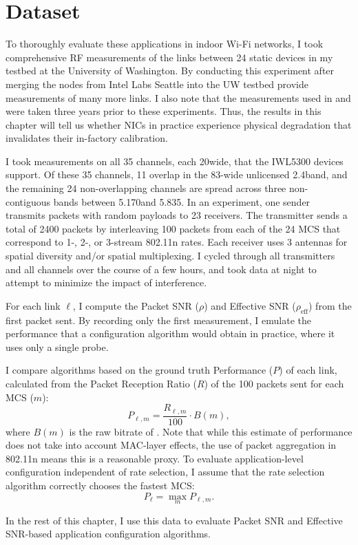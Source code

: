 \section{Dataset}
To thoroughly evaluate these applications in indoor Wi-Fi networks, I took comprehensive RF measurements of the links between 24 static devices in my testbed at the University of Washington. By conducting this experiment after merging the nodes from Intel Labs Seattle into the UW testbed provide measurements of many more links. I also note that the measurements used in  and  were taken three years prior to these experiments. Thus, the results in this chapter will tell us whether NICs in practice experience physical degradation that invalidates their in-factory calibration.

I took measurements on all 35 channels, each 20\MHz wide, that the IWL5300 devices support. Of these 35 channels, 11 overlap in the 83\MHz-wide unlicensed 2.4\GHz band, and the remaining 24 non-overlapping channels are spread across three non-contiguous bands between 5.170\GHz and 5.835\GHz. In an experiment, one sender transmits packets with random payloads to 23 receivers. The transmitter sends a total of 2400 packets by interleaving 100 packets from each of the 24 MCS that correspond to 1-, 2-, or 3-stream 802.11n rates. Each receiver uses 3 antennas for spatial diversity and/or spatial multiplexing. I cycled through all transmitters and all channels over the course of a few hours, and took data at night to attempt to minimize the impact of interference.

For each link $\ell$, I compute the Packet SNR ($\rho$) and Effective SNR ($\rho_\text{eff}$) from the first packet sent. By recording only the first measurement, I emulate the performance that a configuration algorithm would obtain in practice, where it uses only a single probe.

I compare algorithms based on the ground truth Performance ($P$) of each link, calculated from the Packet Reception Ratio ($R$) of the 100 packets sent for each MCS ($m$):
\begin{equation}
	\label{eq:prr_throughput}
	P_{\ell,m} = \frac{R_{\ell,m}}{100} \cdot B(m),
\end{equation}
where $B(m)$ is the raw bitrate of . Note that while this estimate of performance does not take into account MAC-layer effects, the use of packet aggregation in 802.11n means this is a reasonable proxy. To evaluate application-level configuration independent of rate selection, I assume that the rate selection algorithm correctly chooses the fastest MCS:
\begin{equation}
	\label{eq:best_throughput}
	P_\ell = \max_m P_{\ell,m}.
\end{equation}

In the rest of this chapter, I use this data to evaluate Packet SNR and Effective SNR-based application configuration algorithms.